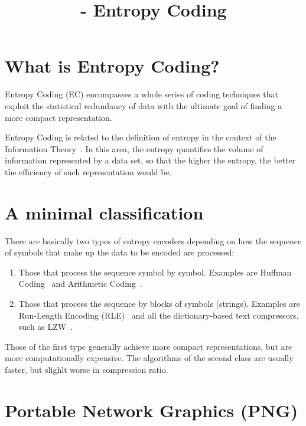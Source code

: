 


\title{\SM{} - Entropy Coding}

\maketitle

\tableofcontents

\section{What is Entropy Coding?}

Entropy Coding (EC) encompasses a whole series of coding techniques
that exploit the statistical redundancy of data with the ultimate goal
of finding a more compact representation.

Entropy Coding is related to the definition of entropy in the context
of the Information Theory~\cite{vruiz__information_theory}. In this
area, the entropy quantifies the volume of information represented by
a data set, so that the higher the entropy, the better the efficiency
of such representation would be.

\section{A minimal classification}

There are basically two types of entropy encoders depending on how the
sequence of symbols that make up the data to be encoded are processed:

\begin{enumerate}
\item Those that process the sequence symbol by symbol. Examples are
  Huffman Coding~\cite{vruiz__huffman_coding} and Arithmetic
  Coding~\cite{vruiz__arithmetic_coding}.
\item Those that process the sequence by blocks of symbols
  (strings). Examples are Run-Length Encoding (RLE)~\cite{vruiz__rle} and all the
  dictionary-based text compressors, such as LZW~\cite{vruiz__LZW}.
\end{enumerate}
  
Those of the first type generally achieve more compact
representations, but are more computationally expensive. The
algorithms of the second class are usually faster, but slighlt worse
in compression ratio.

\section{Portable Network Graphics (PNG)}

